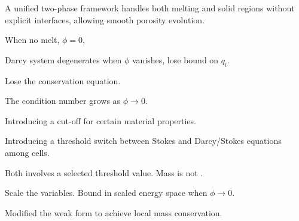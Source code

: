\documentclass[usenames,dvipsnames,letterpaper,landscape,final]{slides}
\theoremstyle{definition}
\begin{document}
\begin{myslide}

 A unified two-phase framework handles both melting and solid regions without explicit 
interfaces, allowing smooth porosity evolution.

 When no melt, $\phi = 0$, 
\begin{nlist}
\item Darcy system degenerates when $\phi$ vanishes, lose bound on $q_l$.
\item Lose the conservation equation.
\item The condition number grows as $\phi \rightarrow 0$.
\end{nlist}

\begin{nlist}
\item Introducing a cut-off for certain material properties. 
\item Introducing a threshold switch between Stokes and Darcy/Stokes equations among cells.  
\end{nlist}
Both involves a selected threshold value.
Mass is not .

		   
\begin{nlist}
\item Scale the variables. Bound in scaled energy space when $\phi \rightarrow 0$.
\item Modified the weak form to achieve local mass conservation.
\end{nlist}

\end{myslide}
\end{document}
